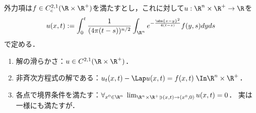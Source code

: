 \documentclass[uplatex,dvipdfmx]{jsreport}
\begin{document}
\begin{theorem}[非斉次方程式の境界値問題の解公式]\label{thm-solution-for-NHE}
    外力項は$f\in C^{2,1}_c(\R\times\R^+)$を満たすとし，これに対して$u:\R^n\times\R^+\to\R$を
    \[u(x,t):=\int^t_0\frac{1}{(4\pi (t-s))^{n/2}}\int_{\R^n}e^{-\frac{\abs{x-y}^2}{4(t-s)}}f(y,s)dyds\]
    で定める．
    \begin{enumerate}
        \item 解の滑らかさ：$u\in C^{2,1}(\R\times\R^+)$．
        \item 非斉次方程式の解である：$u_t(x,t)-\Lap u(x,t)=f(x,t)\;\In\R^n\times\R^+$．
        \item 各点で境界条件を満たす：$\forall_{x^0\in\R^n}\;\lim_{\R^n\times\R^+\ni(x,t)\to(x^0,0)}u(x,t)=0$．
        実は一様にも満たすが．
    \end{enumerate}
\end{theorem}
\end{document}
